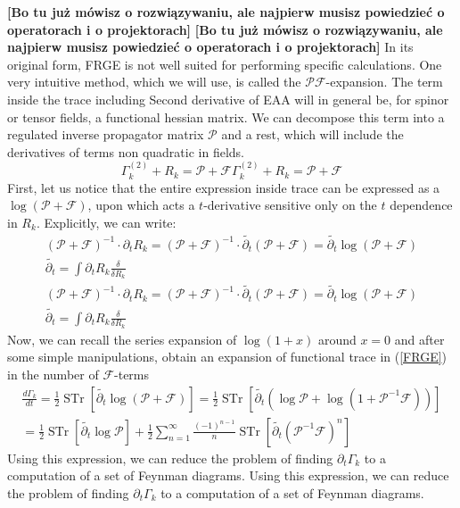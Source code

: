 \documentclass[11pt, a4paper]{article}
\newcommand{\jhkbf}[1]{\textbf{\color{red} [#1]}}
\newcommand{\jhkbf}[1]{\textbf{\color{red} [#1]}}
\begin{document}
\jhkbf{Bo tu już mówisz o rozwiązywaniu, ale najpierw musisz powiedzieć o operatorach i o projektorach}
\jhkbf{Bo tu już mówisz o rozwiązywaniu, ale najpierw musisz powiedzieć o operatorach i o projektorach}
In its original form, FRGE is not well suited for performing specific calculations. One very intuitive method, which
we will use, is called the $\mathcal{PF}$-expansion. 
The term inside the trace including Second derivative of EAA
will in general be, for spinor or tensor fields, a functional hessian matrix. We can decompose this term into a
regulated inverse propagator matrix $\mathcal{P}$ and a rest, which will include the derivatives of terms non quadratic in fields.
\begin{equation}
    \Gamma_k^{(2)} + R_k = \mathcal{P} + \mathcal{F}
    \Gamma_k^{(2)} + R_k = \mathcal{P} + \mathcal{F}
    \label{pf1}
\end{equation}
First, let us notice that the entire expression inside trace can be expressed as a $\log{(\mathcal{P}+\mathcal{F})}$, upon which acts
a $t$-derivative sensitive only on the $t$ dependence in $R_k$. Explicitly, we can write:
\begin{gather}
    \left(\mathcal{P} + \mathcal{F}\right)^{-1} \cdot \partial_t R_k = \left(\mathcal{P} + \mathcal{F}\right)^{-1} \cdot \widetilde{\partial_t} \left(\mathcal{P}+\mathcal{F}\right) = \widetilde{\partial_t} \log{\left(\mathcal{P}+\mathcal{F}\right)}\\
    \widetilde{\partial_t} = \int \partial_t R_k \frac{\delta}{\delta R_k}
\end{gather}
\begin{gather}
    \left(\mathcal{P} + \mathcal{F}\right)^{-1} \cdot \partial_t R_k = \left(\mathcal{P} + \mathcal{F}\right)^{-1} \cdot \widetilde{\partial_t} \left(\mathcal{P}+\mathcal{F}\right) = \widetilde{\partial_t} \log{\left(\mathcal{P}+\mathcal{F}\right)}\\
    \widetilde{\partial_t} = \int \partial_t R_k \frac{\delta}{\delta R_k}
\end{gather}
Now, we can recall the series expansion of $\log{(1+x)}$ around $x=0$ and after some simple manipulations, obtain an expansion of functional trace in (\ref{FRGE}) in
the number of $\mathcal{F}$-terms
\begin{gather}
    \frac{d \Gamma_k}{dt} = \frac{1}{2} \operatorname{STr} \left[ \widetilde{\partial_t} \log{\left(\mathcal{P}+\mathcal{F}\right)} \right] = \frac{1}{2} \operatorname{STr} \left[ \widetilde{\partial_t} \left(\log{\mathcal{P}} + \log{(1+\mathcal{P}^{-1}\mathcal{F})}\right) \right] \\ =  \frac{1}{2} \operatorname{STr} \left[ \widetilde{\partial_t} \log{\mathcal{P}} \right] + \frac{1}{2} \sum_{n=1}^{\infty} \frac{(-1)^{n-1}}{n} \operatorname{STr}\left[\widetilde{\partial_t}\left(\mathcal{P}^{-1}\mathcal{F}\right)^n\right]
    \label{pf}
\end{gather}
Using this expression, we can reduce the problem of finding $\partial_t \Gamma_k$ to a computation of a set of Feynman diagrams.
Using this expression, we can reduce the problem of finding $\partial_t \Gamma_k$ to a computation of a set of Feynman diagrams.
\end{document}
